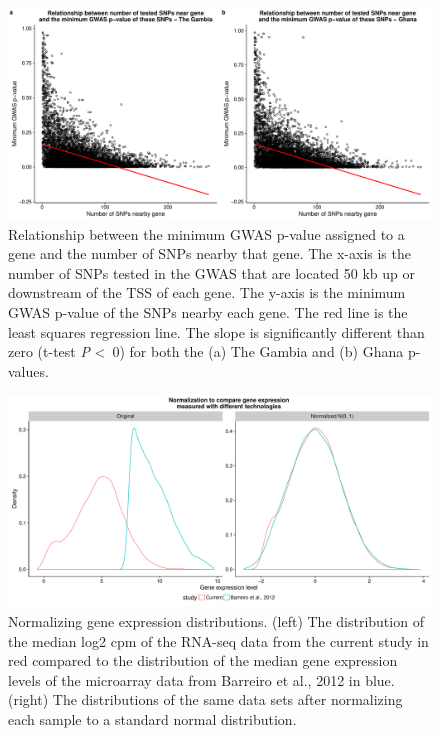 \documentclass[fleqn,10pt]{wlscirep}
\begin{document}
\begin{figure}[ht]
\centering
\includegraphics[width=\linewidth]{../figure/gwas-n-snps.pdf}
\caption{
Relationship between the minimum GWAS p-value assigned to a gene and
the number of SNPs nearby that gene. The x-axis is the number of SNPs
tested in the GWAS that are located 50 kb up or downstream of the TSS
of each gene. The y-axis is the minimum GWAS p-value of the SNPs
nearby each gene. The red line is the least squares regression line.
The slope is significantly different than zero (t-test \emph{P}
\textless \, 0) for both the (a) The Gambia and (b) Ghana p-values.
}
\label{fig:gwas-n-snps}
\end{figure}

\begin{figure}[ht]
\centering
\includegraphics[width=\linewidth]{../figure/combined-distributions.pdf}
\caption{
Normalizing gene expression distributions. (left) The distribution of
the median log2 cpm of the RNA-seq data from the current study in red
compared to the distribution of the median gene expression levels of
the microarray data from Barreiro et al., 2012 \cite{Barreiro2012} in
blue. (right) The distributions of the same data sets after
normalizing each sample to a standard normal distribution.
}
\label{fig:combined-dist}
\end{figure}
\end{document}
